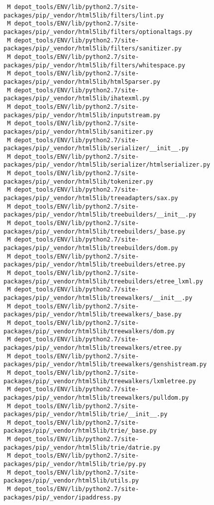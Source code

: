 \documentclass{article}
\begin{document}
\begin{verbatim}
 M depot_tools/ENV/lib/python2.7/site-packages/pip/_vendor/html5lib/filters/lint.py
 M depot_tools/ENV/lib/python2.7/site-packages/pip/_vendor/html5lib/filters/optionaltags.py
 M depot_tools/ENV/lib/python2.7/site-packages/pip/_vendor/html5lib/filters/sanitizer.py
 M depot_tools/ENV/lib/python2.7/site-packages/pip/_vendor/html5lib/filters/whitespace.py
 M depot_tools/ENV/lib/python2.7/site-packages/pip/_vendor/html5lib/html5parser.py
 M depot_tools/ENV/lib/python2.7/site-packages/pip/_vendor/html5lib/ihatexml.py
 M depot_tools/ENV/lib/python2.7/site-packages/pip/_vendor/html5lib/inputstream.py
 M depot_tools/ENV/lib/python2.7/site-packages/pip/_vendor/html5lib/sanitizer.py
 M depot_tools/ENV/lib/python2.7/site-packages/pip/_vendor/html5lib/serializer/__init__.py
 M depot_tools/ENV/lib/python2.7/site-packages/pip/_vendor/html5lib/serializer/htmlserializer.py
 M depot_tools/ENV/lib/python2.7/site-packages/pip/_vendor/html5lib/tokenizer.py
 M depot_tools/ENV/lib/python2.7/site-packages/pip/_vendor/html5lib/treeadapters/sax.py
 M depot_tools/ENV/lib/python2.7/site-packages/pip/_vendor/html5lib/treebuilders/__init__.py
 M depot_tools/ENV/lib/python2.7/site-packages/pip/_vendor/html5lib/treebuilders/_base.py
 M depot_tools/ENV/lib/python2.7/site-packages/pip/_vendor/html5lib/treebuilders/dom.py
 M depot_tools/ENV/lib/python2.7/site-packages/pip/_vendor/html5lib/treebuilders/etree.py
 M depot_tools/ENV/lib/python2.7/site-packages/pip/_vendor/html5lib/treebuilders/etree_lxml.py
 M depot_tools/ENV/lib/python2.7/site-packages/pip/_vendor/html5lib/treewalkers/__init__.py
 M depot_tools/ENV/lib/python2.7/site-packages/pip/_vendor/html5lib/treewalkers/_base.py
 M depot_tools/ENV/lib/python2.7/site-packages/pip/_vendor/html5lib/treewalkers/dom.py
 M depot_tools/ENV/lib/python2.7/site-packages/pip/_vendor/html5lib/treewalkers/etree.py
 M depot_tools/ENV/lib/python2.7/site-packages/pip/_vendor/html5lib/treewalkers/genshistream.py
 M depot_tools/ENV/lib/python2.7/site-packages/pip/_vendor/html5lib/treewalkers/lxmletree.py
 M depot_tools/ENV/lib/python2.7/site-packages/pip/_vendor/html5lib/treewalkers/pulldom.py
 M depot_tools/ENV/lib/python2.7/site-packages/pip/_vendor/html5lib/trie/__init__.py
 M depot_tools/ENV/lib/python2.7/site-packages/pip/_vendor/html5lib/trie/_base.py
 M depot_tools/ENV/lib/python2.7/site-packages/pip/_vendor/html5lib/trie/datrie.py
 M depot_tools/ENV/lib/python2.7/site-packages/pip/_vendor/html5lib/trie/py.py
 M depot_tools/ENV/lib/python2.7/site-packages/pip/_vendor/html5lib/utils.py
 M depot_tools/ENV/lib/python2.7/site-packages/pip/_vendor/ipaddress.py

\end{verbatim}
\end{document}
